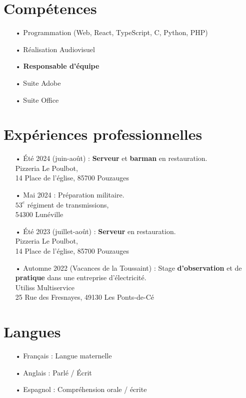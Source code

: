 \documentclass[french]{article}
\begin{document}
\section*{Compétences}
\begin{itemize}
	\item[•] Programmation (Web, React, TypeScript, C, Python, PHP)
	\item[•] Réalisation Audiovisuel
	\item[•] \textbf{Responsable d'équipe}
	\item[•] Suite Adobe
	\item[•] Suite Office
\end{itemize}

\section*{Expériences professionnelles}
\begin{itemize}
	\item[• Été 2024 (juin-août) :] \textbf{Serveur} et \textbf{barman} en restauration. \\ Pizzeria Le Poulbot, \\ 14 Place de l'église, 85700 Pouzauges

	\item[• Mai 2024 :] Préparation militaire. \\ $53^{e}$ régiment de transmissions, \\ 54300 Lunéville
	
	\item[• Été 2023 (juillet-août) :] \textbf{Serveur} en restauration. \\ Pizzeria Le Poulbot, \\ 14 Place de l'église, 85700 Pouzauges

	\item[• Automne 2022 (Vacances de la Toussaint) :] Stage \textbf{d'observation} et de \textbf{pratique} dans une entreprise d'électricité. \\ Utiliss Multiservice \\ 25 Rue des Fresnayes, 49130 Les Ponts-de-Cé
\end{itemize}

\section*{Langues}
\begin{itemize}
	\item[• Français :] Langue maternelle
	
	\item[• Anglais :] Parlé / Écrit

	\item[• Espagnol :] Compréhension orale / écrite
\end{itemize}
\end{document}
